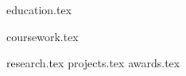 \documentclass[11pt, a4paper]{awesome-cv}
\newcommand*{\sectiondir}{resume/}
\begin{document}
\makecvheader

\begin{minipage}[t]{.4875\linewidth}
  {education.tex}
\end{minipage}%
\begin{minipage}[t]{.025\linewidth}
  \hspace{.05\linewidth}
\end{minipage}%
\begin{minipage}[t]{.4875\linewidth}
  {coursework.tex}
\end{minipage}
{research.tex}
{projects.tex}
{awards.tex}
\end{document}
